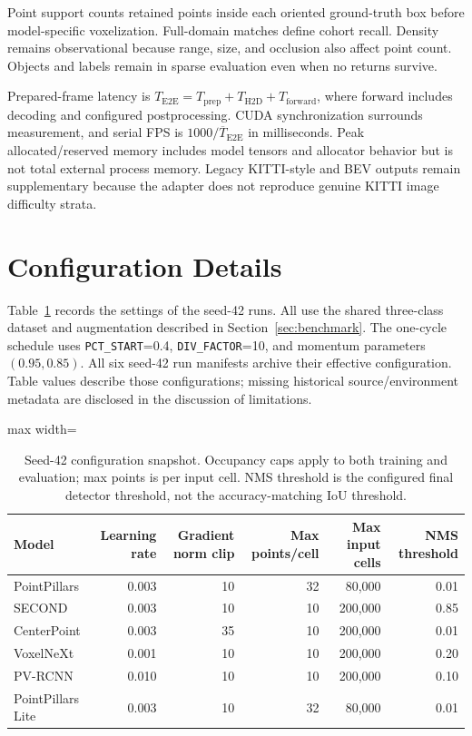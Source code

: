 \documentclass[10pt,twocolumn]{article}
\begin{document}
Point support counts retained points inside each oriented ground-truth box before model-specific voxelization. Full-domain matches define cohort recall. Density remains observational because range, size, and occlusion also affect point count. Objects and labels remain in sparse evaluation even when no returns survive.

Prepared-frame latency is $T_{\mathrm{E2E}}=T_{\mathrm{prep}}+T_{\mathrm{H2D}}+T_{\mathrm{forward}}$, where forward includes decoding and configured postprocessing. CUDA synchronization surrounds measurement, and serial FPS is $1000/\overline{T}_{\mathrm{E2E}}$ in milliseconds. Peak allocated/reserved memory includes model tensors and allocator behavior but is not total external process memory. Legacy KITTI-style and BEV outputs remain supplementary because the adapter does not reproduce genuine KITTI image difficulty strata.
\section{Configuration Details}
\label{app:config}
Table~\ref{tab:config} records the settings of the seed-42 runs. All use the shared three-class dataset and augmentation described in Section~\ref{sec:benchmark}. The one-cycle schedule uses \texttt{PCT\_START}=0.4, \texttt{DIV\_FACTOR}=10, and momentum parameters $(0.95,0.85)$. All six seed-42 run manifests archive their effective configuration. Table values describe those configurations; missing historical source/environment metadata are disclosed in the discussion of limitations.

\begin{table}[!tbp]
\centering\small
\caption{Seed-42 configuration snapshot. Occupancy caps apply to both training and evaluation; max points is per input cell. NMS threshold is the configured final detector threshold, not the accuracy-matching IoU threshold.}
\label{tab:config}
\begin{adjustbox}{max width=\textwidth}\begin{tabular}{lrrrrr}
\toprule
Model & Learning rate & Gradient norm clip & Max points/cell & Max input cells & NMS threshold\\
\midrule
PointPillars & 0.003 & 10 & 32 & 80,000 & 0.01\\
SECOND & 0.003 & 10 & 10 & 200,000 & 0.85\\
CenterPoint & 0.003 & 35 & 10 & 200,000 & 0.01\\
VoxelNeXt & 0.001 & 10 & 10 & 200,000 & 0.20\\
PV-RCNN & 0.010 & 10 & 10 & 200,000 & 0.10\\
PointPillars Lite & 0.003 & 10 & 32 & 80,000 & 0.01\\
\bottomrule
\end{tabular}\end{adjustbox}
\end{table}
\end{document}
